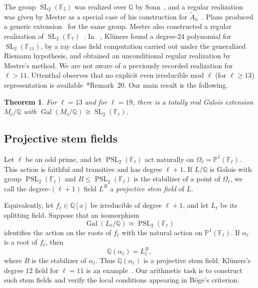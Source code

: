 \documentclass[10pt]{amsart}
\numberwithin{equation}{section}
\newtheorem{theorem}{Theorem}[section]
\theoremstyle{definition}
\theoremstyle{remark}
\newcommand{\PP}{\mathbb P}
\newcommand{\F}{\mathbb{F}}
\newcommand{\Q}{\mathbb{Q}}
\newcommand{\SL}{\operatorname{SL}}
\newcommand{\PSL}{\operatorname{PSL}}
\newcommand{\Gal}{\operatorname{Gal}}
\begin{document}
The group $\SL_2(\F_5)$ was  realized  over
$\Q$ by Sonn~\cite{Sonn1980}, and a regular realization was given by Mestre as
a special case of his construction for $\widetilde A_n$~\cite{Mestre1990}. Plans produced a generic extension~\cite{Plans2007} for the same group. Mestre also
constructed a regular realization of $\SL_2(\F_7)$~\cite{Mestre1994}. In ~\cite{Klueners2000}, Kl\"uners found a degree-$24$ polynomial for $\SL_2(\F_{11})$, by a ray class field
computation carried out under the generalized Riemann hypothesis, and
obtained an unconditional regular realization by Mestre's
method.  We are not aware of a previously recorded
realization for $\ell>11$. 
Uttenthal observes that no explicit even irreducible mod $\ell$ (for $\ell \geq 13$) representation
is available~\cite{Uttenthal2025}*{Remark~20}. Our main result is the following.

\begin{theorem}\label{thm:main}
For $\ell=13$ and for $\ell=19$, there is a totally real Galois extension
$M_\ell/\Q$ with $\Gal(M_\ell/\Q)\cong\SL_2(\F_\ell)$.
\end{theorem}

\subsection{Projective stem fields}\label{subsec:intro-stems}
 Let $\ell$ be an odd prime, and let $\PSL_2(\F_\ell)$ act naturally on
  $\Omega_\ell=\PP^1(\F_\ell)$. This action is faithful and transitive and has
  degree $\ell+1$. If $L/\Q$ is Galois with group $\PSL_2(\F_\ell)$ and
  $B\leq\PSL_2(\F_\ell)$ is the stabilizer of a point of $\Omega_\ell$, we call
  the degree-$(\ell+1)$ field $L^B$ a \emph{projective stem field} of $L$.

  Equivalently, let $f_\ell\in\Q[x]$ be irreducible of degree $\ell+1$, and let
  $L_\ell$ be its splitting field. Suppose that an isomorphism
  \[
   \Gal(L_\ell/\Q)\simeq\PSL_2(\F_\ell)
  \]
  identifies the action on the roots of $f_\ell$ with the natural action on
  $\PP^1(\F_\ell)$. If $\alpha_\ell$ is a root of $f_\ell$, then
  \[
   \Q(\alpha_\ell)=L_\ell^B,
  \]
  where $B$ is the stabilizer of $\alpha_\ell$. Thus $\Q(\alpha_\ell)$ is a
  projective stem field. Kl\"uners's degree $12$ field for $\ell=11$ is an
  example~\cite{Klueners2000}. Our arithmetic task is to construct such stem
  fields and verify the local conditions appearing in B\"oge's criterion.
\end{document}
